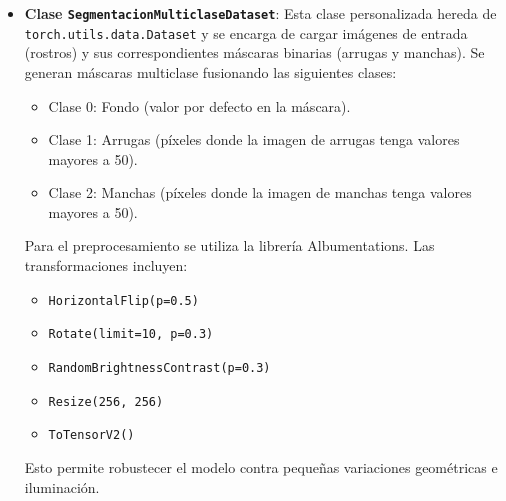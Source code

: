 \begin{itemize}
    \item \textbf{Clase \texttt{SegmentacionMulticlaseDataset}}: Esta clase personalizada hereda de \texttt{torch.utils.data.Dataset} y se encarga de cargar imágenes de entrada (rostros) y sus correspondientes máscaras binarias (arrugas y manchas). Se generan máscaras multiclase fusionando las siguientes clases:
    \begin{itemize}
        \item Clase 0: Fondo (valor por defecto en la máscara).
        \item Clase 1: Arrugas (píxeles donde la imagen de arrugas tenga valores mayores a 50).
        \item Clase 2: Manchas (píxeles donde la imagen de manchas tenga valores mayores a 50).
    \end{itemize}
    Para el preprocesamiento se utiliza la librería Albumentations. Las transformaciones incluyen:
    \begin{itemize}
        \item \texttt{HorizontalFlip(p=0.5)}
        \item \texttt{Rotate(limit=10, p=0.3)}
        \item \texttt{RandomBrightnessContrast(p=0.3)}
        \item \texttt{Resize(256, 256)}
        \item \texttt{ToTensorV2()}
    \end{itemize}
    Esto permite robustecer el modelo contra pequeñas variaciones geométricas e iluminación.


\end{itemize}
